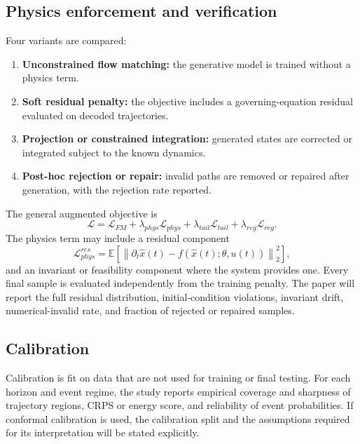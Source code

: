 \documentclass[11pt]{article}
\begin{document}
\subsection{Physics enforcement and verification}

Four variants are compared:
\begin{enumerate}[leftmargin=*]
    \item \textbf{Unconstrained flow matching:} the generative model is trained without a physics term.
    \item \textbf{Soft residual penalty:} the objective includes a governing-equation residual evaluated on decoded trajectories.
    \item \textbf{Projection or constrained integration:} generated states are corrected or integrated subject to the known dynamics.
    \item \textbf{Post-hoc rejection or repair:} invalid paths are removed or repaired after generation, with the rejection rate reported.
\end{enumerate}

The general augmented objective is
\begin{equation}
    \mathcal{L}=\mathcal{L}_{FM}+\lambda_{phys}\mathcal{L}_{phys}+\lambda_{tail}\mathcal{L}_{tail}+\lambda_{reg}\mathcal{L}_{reg}.
\end{equation}
The physics term may include a residual component
\begin{equation}
    \mathcal{L}_{phys}^{res}=\mathbb{E}\left[\left\|\partial_t\hat{x}(t)-f(\hat{x}(t);\theta,u(t))\right\|_2^2\right],
\end{equation}
and an invariant or feasibility component where the system provides one. Every final sample is evaluated independently from the training penalty. The paper will report the full residual distribution, initial-condition violations, invariant drift, numerical-invalid rate, and fraction of rejected or repaired samples.

\subsection{Calibration}

Calibration is fit on data that are not used for training or final testing. For each horizon and event regime, the study reports empirical coverage and sharpness of trajectory regions, CRPS or energy score, and reliability of event probabilities. If conformal calibration is used, the calibration split and the assumptions required for its interpretation will be stated explicitly.
\end{document}
